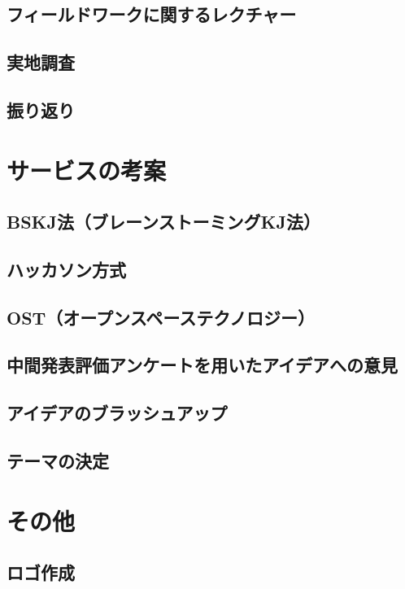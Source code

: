 \documentclass[openany,11pt,papersize]{jsbook}
\begin{document}
\subsection{フィールドワークに関するレクチャー}

\subsection{実地調査}

\subsection{振り返り}


\section{サービスの考案}

\subsection{BSKJ法（ブレーンストーミングKJ法）}

\subsection{ハッカソン方式}

\subsection{OST（オープンスペーステクノロジー）}

\subsection{中間発表評価アンケートを用いたアイデアへの意見}

\subsection{アイデアのブラッシュアップ}

\subsection{テーマの決定}


\section{その他}

\subsection{ロゴ作成}
\end{document}
